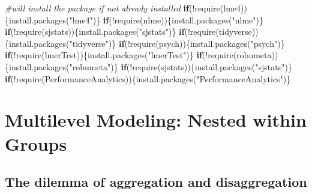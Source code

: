 \documentclass[
  11pt,
]{book}
\newenvironment{Shaded}{\begin{snugshade}}{\end{snugshade}}
\newcommand{\CommentTok}[1]{\textcolor[rgb]{0.56,0.35,0.01}{\textit{#1}}}
\newcommand{\ControlFlowTok}[1]{\textcolor[rgb]{0.13,0.29,0.53}{\textbf{#1}}}
\newcommand{\FunctionTok}[1]{\textcolor[rgb]{0.00,0.00,0.00}{#1}}
\newcommand{\NormalTok}[1]{#1}
\newcommand{\SpecialCharTok}[1]{\textcolor[rgb]{0.00,0.00,0.00}{#1}}
\newcommand{\StringTok}[1]{\textcolor[rgb]{0.31,0.60,0.02}{#1}}
\begin{document}
\begin{Shaded}
\begin{Highlighting}[]
\CommentTok{\#will install the package if not already installed}
\ControlFlowTok{if}\NormalTok{(}\SpecialCharTok{!}\FunctionTok{require}\NormalTok{(lme4))\{}\FunctionTok{install.packages}\NormalTok{(}\StringTok{"lme4"}\NormalTok{)\}}
\ControlFlowTok{if}\NormalTok{(}\SpecialCharTok{!}\FunctionTok{require}\NormalTok{(nlme))\{}\FunctionTok{install.packages}\NormalTok{(}\StringTok{"nlme"}\NormalTok{)\}}
\ControlFlowTok{if}\NormalTok{(}\SpecialCharTok{!}\FunctionTok{require}\NormalTok{(sjstats))\{}\FunctionTok{install.packages}\NormalTok{(}\StringTok{"sjstats"}\NormalTok{)\}}
\ControlFlowTok{if}\NormalTok{(}\SpecialCharTok{!}\FunctionTok{require}\NormalTok{(tidyverse))\{}\FunctionTok{install.packages}\NormalTok{(}\StringTok{"tidyverse"}\NormalTok{)\}}
\ControlFlowTok{if}\NormalTok{(}\SpecialCharTok{!}\FunctionTok{require}\NormalTok{(psych))\{}\FunctionTok{install.packages}\NormalTok{(}\StringTok{"psych"}\NormalTok{)\}}
\ControlFlowTok{if}\NormalTok{(}\SpecialCharTok{!}\FunctionTok{require}\NormalTok{(lmerTest))\{}\FunctionTok{install.packages}\NormalTok{(}\StringTok{"lmerTest"}\NormalTok{)\}}
\ControlFlowTok{if}\NormalTok{(}\SpecialCharTok{!}\FunctionTok{require}\NormalTok{(robumeta))\{}\FunctionTok{install.packages}\NormalTok{(}\StringTok{"robumeta"}\NormalTok{)\}}
\ControlFlowTok{if}\NormalTok{(}\SpecialCharTok{!}\FunctionTok{require}\NormalTok{(sjstats))\{}\FunctionTok{install.packages}\NormalTok{(}\StringTok{"sjstats"}\NormalTok{)\}}
\ControlFlowTok{if}\NormalTok{(}\SpecialCharTok{!}\FunctionTok{require}\NormalTok{(PerformanceAnalytics))\{}\FunctionTok{install.packages}\NormalTok{(}\StringTok{"PerformanceAnalytics"}\NormalTok{)\}}
\end{Highlighting}
\end{Shaded}

\hypertarget{multilevel-modeling-nested-within-groups}{%
\section{Multilevel Modeling: Nested within Groups}\label{multilevel-modeling-nested-within-groups}}

\hypertarget{the-dilemma-of-aggregation-and-disaggregation}{%
\subsection{The dilemma of aggregation and disaggregation}\label{the-dilemma-of-aggregation-and-disaggregation}}
\end{document}
